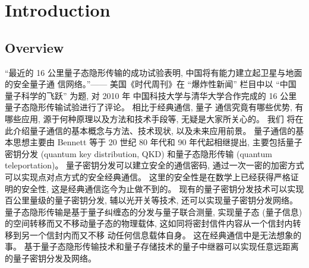 \chapter{Introduction}
\label{chap:introduction}

\section{Overview}
“最近的 16 公里量子态隐形传输的成功试验表明, 中国将有能力建立起卫星与地面的安全量子通
信网络。”—— 美国《时代周刊》在 “爆炸性新闻” 栏目中以 “中国量子科学的飞跃” 为题, 对 2010 年 中国科技大学与清华大学合作完成的 16 公里量子态隐形传输试验进行了评论。 相比于经典通信, 量子 通信究竟有哪些优势, 有哪些应用, 源于何种原理以及方法和技术手段等, 无疑是大家所关心的。 我们 将在此介绍量子通信的基本概念与方法、技术现状, 以及未来应用前景。 量子通信的基本思想主要由 Bennett 等于 20 世纪 80 年代和 90 年代起相继提出, 主要包括量子
密钥分发 (quantum key distribution, QKD)\cite{Bennett2014} 和量子态隐形传输 (quantum teleportation)\cite{Bennett1993}。 量子密钥分发可以建立安全的通信密码, 通过一次一密的加密方式可以实现点对点方式的安全经典通信。 这里的安全性是在数学上已经获得严格证明的安全性, 这是经典通信迄今为止做不到的。 现有的量子密钥分发技术可以实现百公里量级的量子密钥分发, 辅以光开关等技术, 还可以实现量子密钥分发网络。 量子态隐形传输是基于量子纠缠态的分发与量子联合测量, 实现量子态 (量子信息) 的空间转移而又不移动量子态的物理载体, 这如同将密封信件内容从一个信封内转移到另一个信封内而又不移 动任何信息载体自身。 这在经典通信中是无法想象的事。 基于量子态隐形传输技术和量子存储技术的量子中继器可以实现任意远距离的量子密钥分发及网络。


